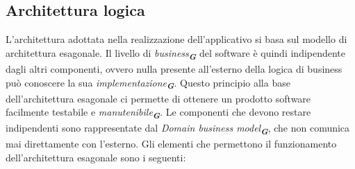 \subsection{Architettura logica}
L’architettura adottata nella realizzazione dell’applicativo si basa sul modello di architettura esagonale. Il livello di \emph{business}\textsubscript{\textbf{\textit{G}}} del software è quindi indipendente dagli altri componenti, ovvero nulla presente all’esterno della logica di business può conoscere la sua \emph{implementazione}\textsubscript{\textbf{\textit{G}}}. Questo principio alla base dell’architettura esagonale ci permette di ottenere un prodotto software facilmente testabile e \emph{manutenibile}\textsubscript{\textbf{\textit{G}}}. Le componenti che devono restare indipendenti sono rappresentate dal \emph{Domain business model}\textsubscript{\textbf{\textit{G}}}, che non comunica mai direttamente con l’esterno.
Gli elementi che permettono il funzionamento dell’architettura esagonale sono i seguenti:
